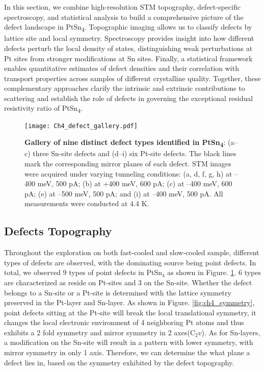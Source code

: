 In this section, we combine high-resolution STM topography, defect-specific spectroscopy, and statistical analysis to build a comprehensive picture of the defect landscape in PtSn\textsubscript{4}. Topographic imaging allows us to classify defects by lattice site and local symmetry. Spectroscopy provides insight into how different defects perturb the local density of states, distinguishing weak perturbations at Pt sites from stronger modifications at Sn sites. Finally, a statistical framework enables quantitative estimates of defect densities and their correlation with transport properties across samples of different crystalline quality. Together, these complementary approaches clarify the intrinsic and extrinsic contributions to scattering and establish the role of defects in governing the exceptional residual resistivity ratio of PtSn\textsubscript{4}.

\begin{figure}
	\centering
	\texttt{[image: Ch4\_defect\_gallery.pdf]}
	\caption[\textbf{Gallery of nine distinct defect types identified in PtSn\textsubscript{4}}]{\textbf{Gallery of nine distinct defect types identified in PtSn\textsubscript{4}}: (a–c) three Sn-site defects and (d–i) six Pt-site defects. The black lines mark the corresponding mirror planes of each defect. STM images were acquired under varying tunneling conditions: (a, d, f, g, h) at –400 meV, 500 pA; (b) at +400 meV, 600 pA; (c) at –400 meV, 600 pA; (e) at –500 meV, 500 pA; and (i) at –400 meV, 500 pA. All measurements were conducted at 4.4 K.}
	\label{fig:ch4_defectgallery}
\end{figure}

\subsection{Defects Topography}
Throughout the exploration on both fast-cooled and slow-cooled sample, different types of defects are observed, with the dominating source being point defects. In total, we observed 9 types of point defects in PtSn$_4$ as shown in Figure. \ref{fig:ch4_defectgallery}. 6 types are characterized as reside on Pt-sites and 3 on the Sn-site. Whether the defect belongs to a Sn-site or a Pt-site is determined with the lattice symmetry preserved in the Pt-layer and Sn-layer. As shown in Figure. \ref{fig:ch4_symmetry}, point defects sitting at the Pt-site will break the local translational symmetry, it changes the local electronic environment of 4 neighboring Pt atoms and thus exhibits a 2 fold symmetry and mirror symmetry in 2 axes(C$_2v$). As for Sn-layers, a modification on the Sn-site will result in a pattern with lower symmetry, with mirror symmetry in only 1 axis. Therefore, we can determine the what plane a defect lies in, based on the symmetry exhibited by the defect topography. 

